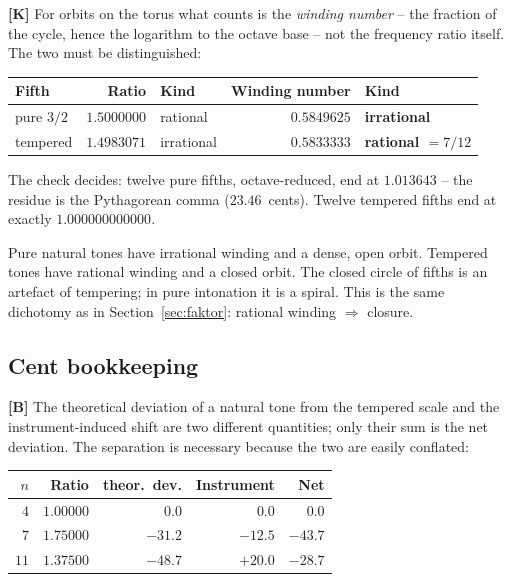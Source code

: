 \textbf{[K]} For orbits on the torus what counts is the \emph{winding
number} -- the fraction of the cycle, hence the logarithm to the octave
base -- not the frequency ratio itself. The two must be
distinguished:

\begin{center}
\begin{tabular}{lrlrl}
\toprule
Fifth & Ratio & Kind & Winding number & Kind \\
\midrule
pure $3/2$ & $1.5000000$ & rational & $0.5849625$ & \textbf{irrational} \\
tempered & $1.4983071$ & irrational & $0.5833333$ & \textbf{rational $= 7/12$} \\
\bottomrule
\end{tabular}
\end{center}

The check decides: twelve pure fifths, octave-reduced, end at
$1.013643$ -- the residue is the Pythagorean comma ($23.46$~cents).
Twelve tempered fifths end at exactly $1.000000000000$.

\begin{keyresult}
Pure natural tones have irrational winding and a dense, open orbit.
Tempered tones have rational winding and a closed orbit. The closed
circle of fifths is an artefact of tempering; in pure intonation it is
a spiral. This is the same dichotomy as in Section~\ref{sec:faktor}:
rational winding $\Rightarrow$ closure.
\end{keyresult}

\subsection{Cent bookkeeping}

\textbf{[B]} The theoretical deviation of a natural tone from the
tempered scale and the instrument-induced shift are two different
quantities; only their sum is the net deviation. The separation is
necessary because the two are easily conflated:

\begin{center}
\begin{tabular}{rrrrr}
\toprule
$n$ & Ratio & theor.\ dev. & Instrument & Net \\
\midrule
$4$ & $1.00000$ & $0.0$ & $0.0$ & $0.0$ \\
$7$ & $1.75000$ & $-31.2$ & $-12.5$ & $-43.7$ \\
$11$ & $1.37500$ & $-48.7$ & $+20.0$ & $-28.7$ \\
\bottomrule
\end{tabular}
\end{center}

